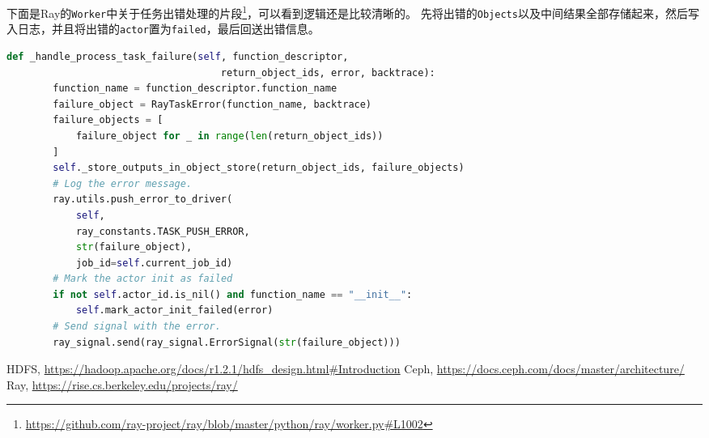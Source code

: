 \documentclass[logo,reportComp]{thesis}
\begin{document}
下面是Ray的\verb'Worker'中关于任务出错处理的片段\footnote{\url{https://github.com/ray-project/ray/blob/master/python/ray/worker.py\#L1002}}，可以看到逻辑还是比较清晰的。
先将出错的\verb'Objects'以及中间结果全部存储起来，然后写入日志，并且将出错的\verb'actor'置为\verb'failed'，最后回送出错信息。
\begin{lstlisting}[language=python]
    def _handle_process_task_failure(self, function_descriptor,
                                     return_object_ids, error, backtrace):
        function_name = function_descriptor.function_name
        failure_object = RayTaskError(function_name, backtrace)
        failure_objects = [
            failure_object for _ in range(len(return_object_ids))
        ]
        self._store_outputs_in_object_store(return_object_ids, failure_objects)
        # Log the error message.
        ray.utils.push_error_to_driver(
            self,
            ray_constants.TASK_PUSH_ERROR,
            str(failure_object),
            job_id=self.current_job_id)
        # Mark the actor init as failed
        if not self.actor_id.is_nil() and function_name == "__init__":
            self.mark_actor_init_failed(error)
        # Send signal with the error.
        ray_signal.send(ray_signal.ErrorSignal(str(failure_object)))
\end{lstlisting}

\begin{thebibliography}{99}
 HDFS, \url{https://hadoop.apache.org/docs/r1.2.1/hdfs_design.html#Introduction}
 Ceph, \url{https://docs.ceph.com/docs/master/architecture/}
 Ray, \url{https://rise.cs.berkeley.edu/projects/ray/}
\end{thebibliography}
\end{document}
